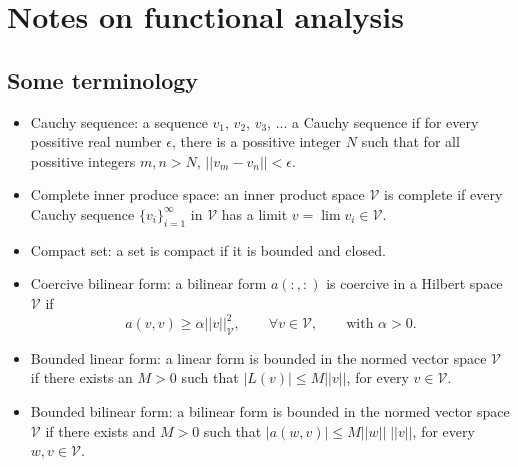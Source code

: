 \documentclass[oneside,a4paper,11pt]{report}
\begin{document}
\chapter{Notes on functional analysis}

\section{Some terminology}
\begin{itemize}
    \item Cauchy sequence: a sequence $v_1$, $v_2$, $v_3$, ... \@is a Cauchy sequence if for every possitive real number $\epsilon$, there is a possitive integer $N$ such that for all possitive integers $m,n>N$, $||v_m-v_n||<\epsilon$. 
    \item Complete inner produce space: an inner product space $\mathcal{V}$ is complete if every Cauchy sequence $\{v_i\}_{i=1}^\infty$ in $\mathcal{V}$ has a limit $v = \lim v_i \in \mathcal{V}$.
    \item Compact set: a set is compact if it is bounded and closed.
    \item Coercive bilinear form: a bilinear form $a(:,:)$ is coercive in a Hilbert space $\mathcal{V}$ if 
    \begin{equation}
        a(v,v) \ge \alpha ||v||_\mathcal{V}^2, \qquad \forall v \in \mathcal{V}, \qquad \text{with }\alpha > 0.
    \end{equation}
    \item Bounded linear form: a linear form is bounded in the normed vector space $\mathcal{V}$ if there exists an $M>0$ such that $|L(v)| \le M ||v||$, for every $v \in \mathcal{V}$. 
    \item Bounded bilinear form: a bilinear form is bounded in the normed vector space $\mathcal{V}$ if there exists and $M>0$ such that $|a(w,v)| \le M ||w||\;||v||$, for every $w,v \in \mathcal{V}$.
\end{itemize}

\end{document}
